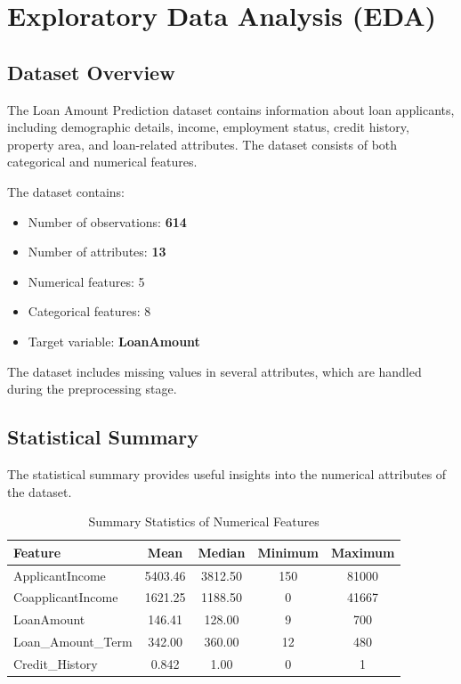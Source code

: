 \documentclass{article}
\begin{document}
\section{Exploratory Data Analysis (EDA)} 
\subsection{Dataset Overview} 
The Loan Amount Prediction dataset contains information about loan applicants, including demographic details, income, employment status, credit history, property area, and loan-related attributes. The dataset consists of both categorical and numerical features. 

The dataset contains: 
\begin{itemize} 
    \item Number of observations: \textbf{614} 
    \item Number of attributes: \textbf{13} 
    \item Numerical features: 5 
    \item Categorical features: 8 
    \item Target variable: \textbf{LoanAmount} 
\end{itemize} 
The dataset includes missing values in several attributes, which are handled during the preprocessing stage. 

\subsection{Statistical Summary} 
The statistical summary provides useful insights into the numerical attributes of the dataset. 

\begin{table}[H] 
\centering 
\caption{Summary Statistics of Numerical Features} 
\begin{tabular}{|l|c|c|c|c|} 
\hline 
\textbf{Feature} & \textbf{Mean} & \textbf{Median} & \textbf{Minimum} & \textbf{Maximum}\\ \hline 
ApplicantIncome & 5403.46 & 3812.50 & 150 & 81000\\ 
CoapplicantIncome & 1621.25 & 1188.50 & 0 & 41667\\ 
LoanAmount & 146.41 & 128.00 & 9 & 700\\ 
Loan\_Amount\_Term & 342.00 & 360.00 & 12 & 480\\ 
Credit\_History & 0.842 & 1.00 & 0 & 1\\ \hline 
\end{tabular} 
\end{table} 
\end{document}
